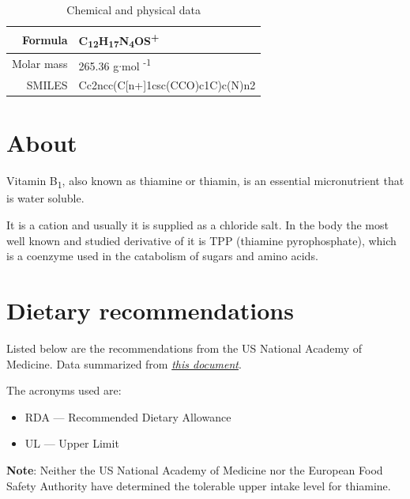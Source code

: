 \documentclass{book}
\begin{document}
\begin{table}[h]
	\caption{Chemical and physical data}
	\centering \begin{tabular}{| r | l |}
		\hline
		Formula & C\textsubscript{12}H\textsubscript{17}N\textsubscript{4}OS\textsuperscript{+}\\ \hline
		Molar mass & 265.36 g$\cdot$mol \textsuperscript{-1}\\ \hline
		SMILES & Cc2ncc(C[n+]1csc(CCO)c1C)c(N)n2\\ \hline
	\end{tabular}
\end{table}
\newpage

\section{About}
Vitamin B\textsubscript{1}, also known as thiamine or thiamin, is an essential micronutrient that is water soluble.

It is a cation and usually it is supplied as a chloride salt. In the body the most well known and studied derivative of it is TPP (thiamine pyrophosphate), which is a coenzyme used in the catabolism of sugars and amino acids.

\section{Dietary recommendations}
Listed below are the recommendations from the US National Academy of Medicine. Data summarized from \href{https://nap.nationalacademies.org/read/6015/chapter/6}{\textit{this document}}.

The acronyms used are:
\begin{itemize}
	\item RDA --- Recommended Dietary Allowance
	\item UL --- Upper Limit
\end{itemize}

\textbf{Note}: Neither the US National Academy of Medicine nor the European Food Safety Authority have determined the tolerable upper intake level for thiamine.
\end{document}
